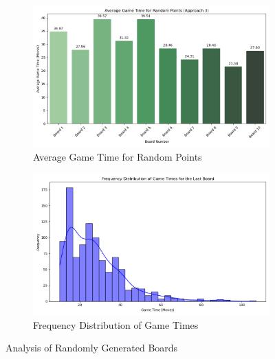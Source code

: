 \documentclass[12pt]{report}
\begin{document}
	\begin{figure}[h]
		\centering
		\begin{subfigure}[b]{0.48\textwidth}
			\includegraphics[width=\linewidth]{../withLength/RandomLength/approach_3_random_points}
			\caption{Average Game Time for Random Points}
			\label{fig:approach3randompoints}
		\end{subfigure}
		\hfill
		\begin{subfigure}[b]{0.48\textwidth}
			\includegraphics[width=\linewidth]{../withLength/RandomLength/approach_3_game_time_distribution}
			\caption{Frequency Distribution of Game Times}
			\label{fig:approach3gametimedistribution}
		\end{subfigure}
		\caption{Analysis of Randomly Generated Boards}
	\end{figure}
	
\end{document}
